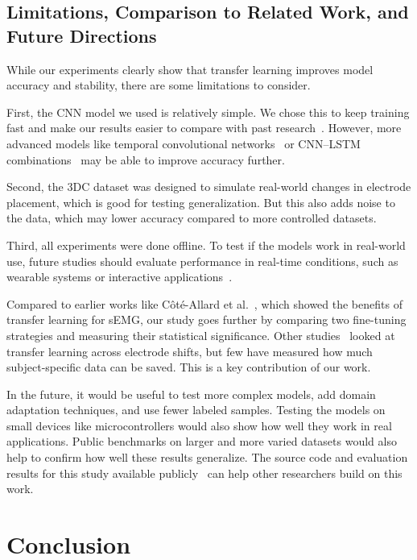 \begin{multicols}{2}
\subsection*{Limitations, Comparison to Related Work, and Future Directions}

While our experiments clearly show that transfer learning improves model accuracy and stability, there are some limitations to consider.

First, the CNN model we used is relatively simple. We chose this to keep training fast and make our results easier to compare with past research~\cite{Cote2019_3DC,LibEMG2023}. However, more advanced models like temporal convolutional networks~\cite{Xie2024} or CNN–LSTM combinations~\cite{Faust2018} may be able to improve accuracy further.

Second, the 3DC dataset was designed to simulate real-world changes in electrode placement, which is good for testing generalization. But this also adds noise to the data, which may lower accuracy compared to more controlled datasets.

Third, all experiments were done offline. To test if the models work in real-world use, future studies should evaluate performance in real-time conditions, such as wearable systems or interactive applications~\cite{Shen2020}.

Compared to earlier works like Côté-Allard et al.~\cite{Cote2019}, which showed the benefits of transfer learning for sEMG, our study goes further by comparing two fine-tuning strategies and measuring their statistical significance. Other studies~\cite{Lehmler2021, Ameri2020} looked at transfer learning across electrode shifts, but few have measured how much subject-specific data can be saved. This is a key contribution of our work.

In the future, it would be useful to test more complex models, add domain adaptation techniques, and use fewer labeled samples. Testing the models on small devices like microcontrollers would also show how well they work in real applications. Public benchmarks on larger and more varied datasets would also help to confirm how well these results generalize. The source code and evaluation results for this study available publicly~\cite{Kolomiiets2025} can help other researchers build on this work.

\section*{Conclusion}


\end{multicols}
